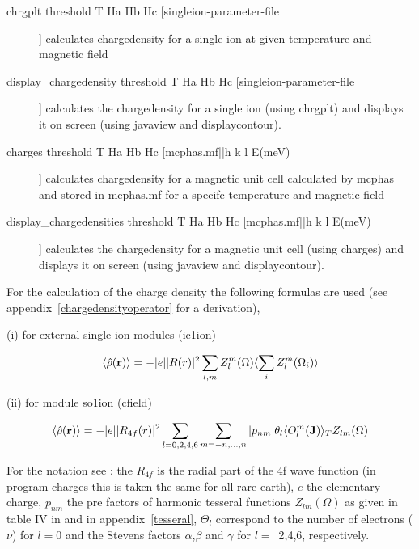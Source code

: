 \begin{description} 
\item [chrgplt  threshold T Ha Hb Hc [singleion-parameter-file]]
 calculates chargedensity for a single ion at given temperature and magnetic field
\item [display\_chargedensity  threshold T Ha Hb Hc [singleion-parameter-file]]
 calculates the chargedensity for a single ion (using {\prg chrgplt})
 and displays it on screen (using {\prg javaview} and {\prg displaycontour}).
\item [charges threshold T Ha Hb Hc [mcphas.mf||h k l E(meV)]]
 calculates chargedensity for a magnetic unit cell calculated by {\prg mcphas} and
 stored in {\prg mcphas.mf} for a specifc temperature and magnetic field
\item [display\_chargedensities threshold T Ha Hb Hc [mcphas.mf||h k l E(meV)]]
 calculates the chargedensity for a magnetic unit cell (using {\prg charges})
 and displays it on screen (using {\prg javaview} and {\prg displaycontour}).
\end{description}

   For the calculation of the charge density the following formulas are used (see %
appendix~\ref{chargedensityoperator} for a derivation), 

(i) for external single ion modules ({\prg ic1ion})
   
  \begin{equation}\label{chargedensity}
	       \langle \hat\rho(\mathbf r)\rangle=
	       -|e|  |R(r)|^2 \sum_{l,m}Z_l^{m}(\Omega) \langle\sum_i Z_l^{m}(\Omega_i)\rangle
   \end{equation} 
  
(ii) for module {\prg so1ion} ({\prg cfield})
   
   \begin{equation}\label{chargedensity_operator}
	       \langle \hat\rho(\mathbf r)\rangle=-|e||R_{4f}(r)|^2 \sum_{l=0,2,4,6}\sum_{m=-n,...,n}
	        |p_{nm}| \theta_{l} \langle O_l^m(\mathbf J)\rangle_T Z_{lm}(\Omega)
	      \end{equation}
		  
For the notation see \cite{hutchings64-227}: the $R_{4f}$ is the radial part of the
4f wave function (in program {\prg charges} this is taken the same for all
rare earth), $e$ the elementary charge, $p_{nm}$ the pre factors of harmonic tesseral
functions $Z_{lm}(\Omega)$ as given in table IV in \cite{hutchings64-227} and in appendix~\ref{tesseral}, %
$\Theta_l$
correspond to the number of electrons ($\nu$) for $l=0$
 and the Stevens factors $\alpha$,$\beta$ and $\gamma$ for $l=$~2,4,6, respectively.

